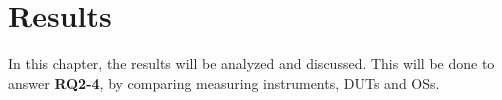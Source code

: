 \chapter{Results}\label{ch:results}

In this chapter, the results will be analyzed and discussed. This will be done to answer \textbf{RQ2-4}, by comparing measuring instruments, DUTs and OSs.






